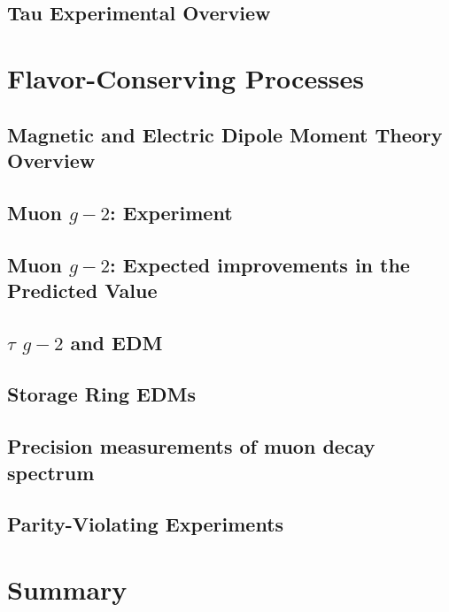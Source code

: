 
\subsection{Tau Experimental Overview}\label{sec:cl:tauexp}



\section{Flavor-Conserving Processes}\label{sec:cl:fcp}

\subsection{ Magnetic and Electric Dipole Moment Theory Overview}\label{sec:cl:fct}


\subsection{Muon $g-2$:  Experiment}


\subsection{Muon $g-2$:  Expected improvements in the Predicted Value}


\subsection{$\tau$ $g-2$ and EDM}

\subsection{Storage Ring EDMs}


\subsection{Precision measurements of muon decay spectrum}


\subsection{Parity-Violating Experiments}\label{sec:cl:pve}


\section{Summary}\label{sec:cl:gm2edmdisc}





